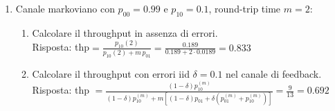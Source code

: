\documentclass{article}
\begin{document}
\begin{enumerate}
    \item Canale markoviano con $p_{00} = 0.99$ e $p_{10} = 0.1$, round-trip time $m=2$:
    \begin{enumerate}[label=\alph*)]
        \item Calcolare il throughput in assenza di errori.\\
        
        Risposta: thp$ = \frac{p_{10}(2)}{p_{10}(2)+m\,p_{01}} = \frac{0.189}{0.189+2\cdot 0.0189} = 0.833$
        \item Calcolare il throughput con errori iid $\delta = 0.1$ nel canale di feedback.\\
        
        Risposta: thp $= \frac{(1-\delta)p_{10}^{(m)}}{(1-\delta)p_{10}^{(m)} + m \left[(1 - \delta)p_{01} + \delta \left( p_{01}^{(m)} + p_{10}^{(m)} \right)\right]} = \frac{9}{13} = 0.692$
    \end{enumerate}

\end{enumerate}

\newpage
\end{document}
